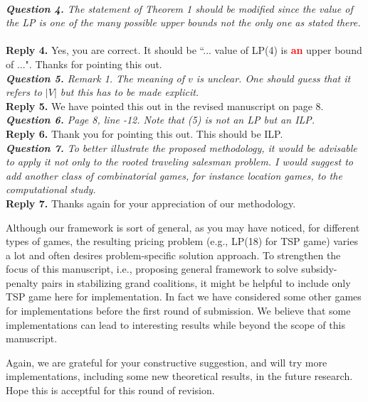 \documentclass[11pt]{article}
\begin{document}
\\[4mm]
%
%
%
\noindent \textit{\textbf{Question 4.}
The statement of Theorem 1 should be modified since the value of the
LP is one of the many possible upper bounds not the only one as stated
there.
}
~\\[2mm]
\noindent \textbf{Reply 4.}
Yes, you are correct. It should be ``... value of LP(4) is \textcolor{red}{\bf an} upper bound of ...". Thanks for pointing this out.
~\\[4mm]
%
%
%
\noindent \textit{\textbf{Question 5.}
Remark 1. The meaning of $v$ is unclear. One should guess that it refers
to $|V|$ but this has to be made explicit.
}
\\[2mm]
\noindent \textbf{Reply 5.}
We have pointed this out in the revised manuscript on page 8.
\\[4mm]
%
%
%
\noindent \textit{\textbf{Question 6.}
Page 8, line -12. Note that (5) is not an LP but an ILP.
}
\\[2mm]
\noindent \textbf{Reply 6.}
Thank you for pointing this out.
This should be ILP.
\\[4mm]
%
%
%
\noindent \textit{\textbf{Question 7.}
To better illustrate the proposed methodology, it would be advisable
to apply it not only to the rooted traveling salesman problem. I would
suggest to add another class of combinatorial games, for instance location games, to the computational study.}
\\[2mm]
\noindent \textbf{Reply 7.}
Thanks again for your appreciation of our methodology.

Although our framework is sort of general, as you may have noticed, for different types of games, the resulting pricing problem (e.g., LP(18) for TSP game) varies a lot and often desires problem-specific solution approach.
To strengthen the focus of this manuscript, i.e., proposing general framework to solve subsidy-penalty pairs in stabilizing grand coalitions, it might be helpful to include only TSP game here for implementation.
In fact we have considered some other games for implementations before the first round of submission.
We believe that some implementations can lead to interesting results while beyond the scope of this manuscript.

Again, we are grateful for your constructive suggestion, and will try more implementations, including some new theoretical results, in the future research.
Hope this is acceptful for this round of revision.
\\[4mm]
%
%
\end{document}
